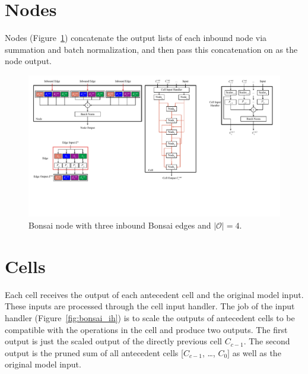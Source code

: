 \section{Nodes} \label{sect:bonsai_appendix_nodes}
Nodes (Figure~\ref{fig:bonsai_node}) concatenate the output lists of each inbound node via summation and batch normalization, and then pass this
concatenation on as the node output.
\begin{figure}[ht]
	\centering
	\includegraphics[width=.9\textwidth]{node}
	\caption[Bonsai node with three inbound Bonsai edges and $|\mathcal{O}|=4$]{Bonsai node with three inbound Bonsai edges and $|\mathcal{O}|=4$.}
	\label{fig:bonsai_node}
\end{figure}
\vspace*{-1cm}

\section{Cells} \label{sect:bonsai_appendix_cells}
Each cell receives the output of each antecedent cell and the original model input. These
inputs are processed through the cell input handler. The job of the input handler (Figure~\ref{fig:bonsai_ih})
is to scale the outputs of antecedent cells to be compatible with the operations in the cell and produce two outputs.
The first output is just the scaled output of the directly previous cell $C_{c-1}$. The second output is the pruned
sum of all antecedent cells [$C_{c-1}$, \dots, $C_{0}]$ as well as the original model input.


